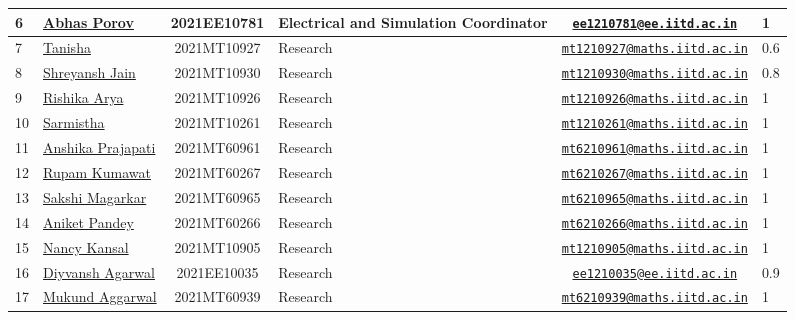 \documentclass[table]{rapportCS}
\begin{document}
\begin{table}[h]
\begin{tabular}{|p{.5cm}|p{3cm}|c|p{2.58cm}|c|p{0.3cm}|}
6 & \href{https://www.linkedin.com/in/abhas-porov-b69077248/}{Abhas
Porov} & 2021EE10781 & Electrical and Simulation Coordinator &
\href{mailto:ee1210781@ee.iitd.ac.in}{\nolinkurl{ee1210781@ee.iitd.ac.in}}
& 1 \\
\hline
7 & \href{https://www.linkedin.com/in/tanisha-jangra-5203132ab}{Tanisha}
& 2021MT10927 & Research  &
\href{mailto:mt1210927@maths.iitd.ac.in}{\nolinkurl{mt1210927@maths.iitd.ac.in}}
& 0.6 \\
8 &
\href{https://www.linkedin.com/in/shreyansh-jain-6abb9124b/}{Shreyansh
Jain} & 2021MT10930 & Research  &
\href{mailto:mt1210930@maths.iitd.ac.in}{\nolinkurl{mt1210930@maths.iitd.ac.in}}
& 0.8 \\
9 & \href{https://www.linkedin.com/in/rishika-arya-266082279/}{Rishika
Arya} & 2021MT10926 & Research  &
\href{mailto:mt1210926@maths.iitd.ac.in}{\nolinkurl{mt1210926@maths.iitd.ac.in}}
& 1 \\
10 &
\href{https://www.linkedin.com/in/sarmistha-subhadarshini-507172243}{Sarmistha
} & 2021MT10261 & Research  &
\href{mailto:mt1210261@maths.iitd.ac.in}{\nolinkurl{mt1210261@maths.iitd.ac.in}}
& 1 \\

11 &
\href{https://www.linkedin.com/in/anshika-prajapati-9b855022b/}{Anshika
Prajapati} & 2021MT60961 & Research  &
\href{mailto:mt6210961@maths.iitd.ac.in}{\nolinkurl{mt6210961@maths.iitd.ac.in}}
& 1 \\
12 & \href{https://www.linkedin.com/in/rupam-kumawat-b27949253/}{Rupam Kumawat} & 2021MT60267 & Research &
\href{mailto:mt6210267@maths.iitd.ac.in}{\nolinkurl{mt6210267@maths.iitd.ac.in}}
& 1 \\
 
        13 & \href{www.linkedin.com/in/sakshimagarkar/}{Sakshi Magarkar} & 2021MT60965 & Research & \href{mailto:mt6210965@maths.iitd.ac.in}{\nolinkurl{mt6210965@maths.iitd.ac.in}} & 1 \\
        14 & \href{https://www.linkedin.com/in/aniket-pandey-b5b9a1263/}{Aniket Pandey} & 2021MT60266 & Research & \href{mailto:mt6210266@maths.iitd.ac.in}{\nolinkurl{mt6210266@maths.iitd.ac.in}} & 1 \\
        15 & \href{https://www.linkedin.com/in/nancy-kansal-1b5384234/}{Nancy Kansal} & 2021MT10905 & Research & \href{mailto:mt1210905@maths.iitd.ac.in}{\nolinkurl{mt1210905@maths.iitd.ac.in}} & 1 \\
        16 & \href{https://www.linkedin.com/in/divyansh-agarwal-22989525b/}{Diyvansh Agarwal} & 2021EE10035 & Research & \href{mailto:ee1210035@ee.iitd.ac.in}{\nolinkurl{ee1210035@ee.iitd.ac.in}} & 0.9 \\
        17 & \href{https://www.linkedin.com/in/mukund-aggarwal}{Mukund Aggarwal} & 2021MT60939 & Research & \href{mailto:mt6210939@maths.iitd.ac.in}{\nolinkurl{mt6210939@maths.iitd.ac.in}} & 1 \\
        \hline
\end{tabular}

\end{table}
\end{document}
